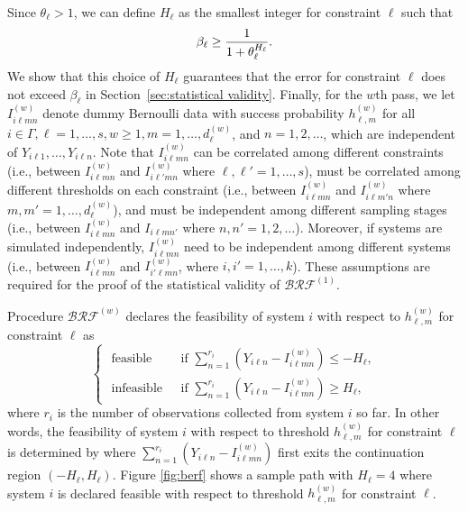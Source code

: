 \documentclass[11pt]{article}
\begin{document}
Since $\theta_\ell>1$, we can define $H_\ell$ as the smallest integer for constraint $\ell$ such that 
\begin{equation}
\beta_\ell \ge {1 \over 1 + \theta_\ell^{H_\ell}}.\label{eqn:H}
\end{equation}
We show that this choice of $H_\ell$ guarantees that the error for constraint $\ell$ does not exceed $\beta_\ell$ in Section~\ref{sec:statistical validity}.
Finally, for the $w$th pass, we let $I_{i\ell mn}^{(w)}$ denote dummy Bernoulli data with success probability $h_{\ell,m}^{(w)}$ for all $i\in\Gamma, \ell=1,\ldots,s, w\geq 1, m=1,\ldots,d_\ell^{(w)}$, and $n=1,2,\ldots$, which are independent of $Y_{i \ell 1},\ldots, Y_{i \ell n}$. 
Note that $I_{i\ell m n}^{(w)}$ can be correlated among different constraints (i.e., between $I_{i\ell m n}^{(w)}$ and $I_{i\ell' m n}^{(w)}$ where $\ell, \ell'=1,\ldots, s$), must be correlated among different thresholds on each constraint (i.e., between $I_{i\ell m n}^{(w)}$ and $I_{i\ell m' n}^{(w)}$ where $m, m'=1,\ldots,d_\ell^{(w)}$), and must be independent among different sampling stages (i.e., between $I_{i\ell mn}^{(w)}$ and $I_{i\ell m n'}$ where $n,n'=1,2,\ldots$). Moreover, if systems are simulated independently, $I_{i\ell m n}^{(w)}$ need to be independent among different systems (i.e., between $I_{i\ell m n}^{(w)}$ and $I_{i'\ell m n}^{(w)}$, where $i, i'=1,\ldots,k$). These assumptions are required for the proof of the statistical validity of $\mathcal{BRF}^{(1)}$.
 

Procedure $\mathcal{BRF}^{(w)}$ declares the feasibility of system $i$ with respect to $h_{\ell, m}^{(w)}$ for constraint $\ell$ as 
\begin{equation}
\begin{cases}
\text { feasible } & \text { if } \sum_{n=1}^{r_i}\left(Y_{i\ell n} -I_{i\ell mn}^{(w)}\right)\leq -H_\ell, \\ 
\text { infeasible } & \text { if } \sum_{n=1}^{r_i} \left(Y_{i\ell n} -I_{i\ell mn}^{(w)}\right)\geq H_\ell,  
\end{cases}  \label{eqn:BeRF_Decision1}
\end{equation}
where $r_i$ is the number of observations collected from system $i$ so far. 
In other words, the feasibility of system $i$ with respect to threshold $h_{\ell, m}^{(w)}$ for constraint $\ell$ is determined by where $\sum_{n=1}^{r_i}(Y_{i\ell n} -I_{i\ell mn}^{(w)})$ first exits the continuation region $(-H_\ell,H_\ell)$. Figure \ref{fig:berf} shows a sample path with $H_\ell=4$ where system $i$ is declared feasible with respect to threshold $h_{\ell, m}^{(w)}$ for constraint $\ell$.
\end{document}
